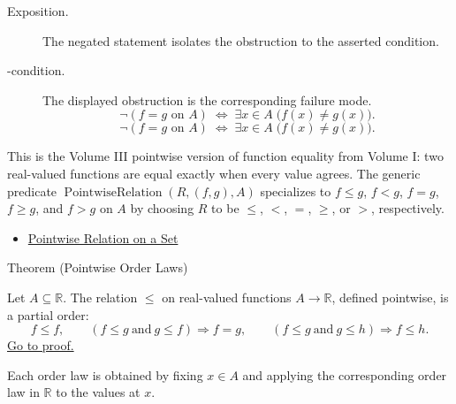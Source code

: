 \begin{remark*}
\begin{description}
  \item[Exposition.]
  The negated statement isolates the obstruction to the asserted condition.

  \item[\exists-condition.]
  The displayed obstruction is the corresponding failure mode.
  \[
  \neg(f=g\text{ on }A)
  \;\Longleftrightarrow\;
  \exists x\in A\;\bigl(f(x)\neq g(x)\bigr).
\]
  \[
  \neg(f=g\text{ on }A)
  \;\Longleftrightarrow\;
  \exists x\in A\;\bigl(f(x)\neq g(x)\bigr).
\]
\end{description}
\end{remark*}



\begin{remark*}[Interpretation]
This is the Volume III pointwise version of function equality from Volume I:
two real-valued functions are equal exactly when every value agrees.  The
generic predicate \(\operatorname{PointwiseRelation}(R,(f,g),A)\)
specializes to \(f\leq g\), \(f<g\), \(f=g\), \(f\geq g\), and \(f>g\) on
\(A\) by choosing \(R\) to be \(\leq\), \(<\), \(=\), \(\geq\), or \(>\),
respectively.
\end{remark*}

\begin{dependencies}
\begin{itemize}
  \item \hyperref[def:pointwise-relation-on-set]{Pointwise Relation on a Set}
\end{itemize}
\end{dependencies}

\begin{theorembox}{Theorem (Pointwise Order Laws)}
\begin{theorem}
\label{thm:pointwise-order-laws}
Let \(A\subseteq\mathbb{R}\).  The relation \(\leq\) on real-valued
functions \(A\to\mathbb{R}\), defined pointwise, is a partial order:
\[
  f\leq f,\qquad
  (f\leq g\ \text{and}\ g\leq f)\Rightarrow f=g,\qquad
  (f\leq g\ \text{and}\ g\leq h)\Rightarrow f\leq h.
\]
\hyperref[prf:pointwise-order-laws]{Go to proof.}
\end{theorem}
\end{theorembox}

\begin{remark*}
Each order law is obtained by fixing \(x\in A\) and applying the
corresponding order law in \(\mathbb{R}\) to the values at \(x\).
\end{remark*}

